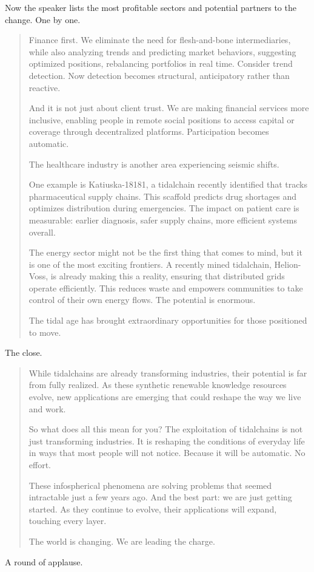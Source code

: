 
Now the speaker lists the most profitable sectors and potential partners to the change. One by one.

\begin{quote}
Finance first. We eliminate the need for flesh-and-bone intermediaries, while also analyzing trends and predicting market behaviors, suggesting optimized positions, rebalancing portfolios in real time. Consider trend detection. Now detection becomes structural, anticipatory rather than reactive.

And it is not just about client trust. We are making financial services more inclusive, enabling people in remote social positions to access capital or coverage through decentralized platforms. Participation becomes automatic.

The healthcare industry is another area experiencing seismic shifts.

One example is Katiuska-18181, a tidalchain recently identified that tracks pharmaceutical supply chains. This scaffold predicts drug shortages and optimizes distribution during emergencies. The impact on patient care is measurable: earlier diagnosis, safer supply chains, more efficient systems overall.

The energy sector might not be the first thing that comes to mind, but it is one of the most exciting frontiers. A recently mined tidalchain, Helion-Voss, is already making this a reality, ensuring that distributed grids operate efficiently. This reduces waste and empowers communities to take control of their own energy flows. The potential is enormous.

The tidal age has brought extraordinary opportunities for those positioned to move.

\end{quote}


The close.

\begin{quote}
While tidalchains are already transforming industries, their potential is far from fully realized. As these synthetic renewable knowledge resources evolve, new applications are emerging that could reshape the way we live and work.

So what does all this mean for you? The exploitation of tidalchains is not just transforming industries. It is reshaping the conditions of everyday life in ways that most people will not notice. Because it will be automatic. No effort.

These infospherical phenomena are solving problems that seemed intractable just a few years ago. And the best part: we are just getting started. As they continue to evolve, their applications will expand, touching every layer.

The world is changing. We are leading the charge.

\end{quote}

A round of applause.

